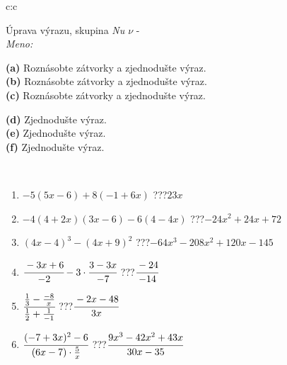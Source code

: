 \documentclass[10pt]{report}
\begin{document}
\newpage
\thispagestyle{empty}
\begin{tabular}{c:c}
\begin{minipage}[c][104.5mm][t]{0.5\linewidth}
\begin{center}
\vspace{7mm}
{\huge Úprava výrazu, skupina \textit{Nu $\nu$} -}\\[5mm]
\textit{Meno:}\phantom{xxxxxxxxxxxxxxxxxxxxxxxxxxxxxxxxxxxxxxxxxxxxxxxxxxxxxxxxxxxxxxxxx}\\[5mm]
\begin{minipage}{0.95\linewidth}
\begin{center}
{\small \begin{minipage}{0.6\textwidth}
\textbf{(a)} Roznásobte zátvorky a zjednodušte výraz. \\[1mm]
\textbf{(b)} Roznásobte zátvorky a zjednodušte výraz. \\[1mm]
\textbf{(c)} Roznásobte zátvorky a zjednodušte výraz.
\end{minipage} \begin{minipage}{0.39\textwidth}
\textbf{(d)} Zjednodušte výraz. \\[1mm]
\textbf{(e)} Zjednodušte výraz. \\[1mm]
\textbf{(f)} Zjednodušte výraz.
\end{minipage}
}
\end{center}
\end{minipage}
\\[4mm]
\begin{minipage}{0.79\linewidth}
\begin{center}
\begin{varwidth}{\linewidth}
\begin{enumerate}
\normalsize
\item $-5(5x-6)+8(-1+6x)$\quad \dotfill\; ???\;\dotfill \quad $23x$
\item $-4(4+2x)(3x-6)-6(4-4x)$\quad \dotfill\; ???\;\dotfill \quad $-24x^2+24x+72$
\item $(4x-4)^3-(4x+9)^2$\quad \dotfill\; ???\;\dotfill \quad $-64x^3-208x^2+120x-145$
\item $\cfrac{-3x+6}{-2}-3\cdot\cfrac{3-3x}{-7}$\quad \dotfill\; ???\;\dotfill \quad $\cfrac{-24}{-14}$
\item $\cfrac{\frac{1}{3}-\frac{-8}{x}}{\frac{1}{2}+\frac{1}{-1}}$\quad \dotfill\; ???\;\dotfill \quad $\cfrac{-2x-48}{3x}$
\item $\cfrac{(-7+3x)^2-6}{(6x-7)\cdot\frac{5}{x}}$\quad \dotfill\; ???\;\dotfill \quad $\cfrac{9x^3-42x^2+43x}{30x-35}$

\end{enumerate}
\end{varwidth}
\end{center}
\end{minipage}
\end{center}
\end{minipage}
\end{tabular}
\end{document}
